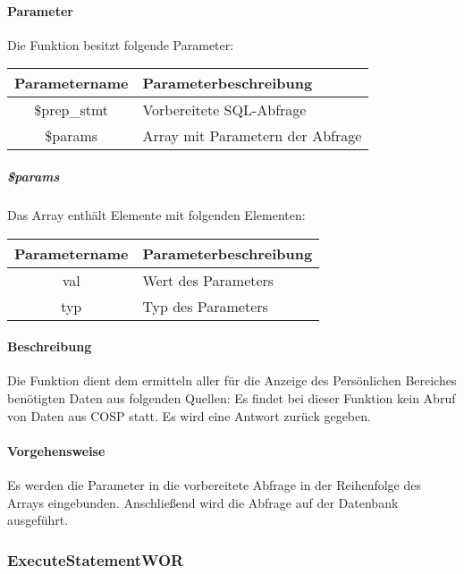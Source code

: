 \paragraph{Parameter} Die Funktion besitzt folgende Parameter:
\begin{table}[H]
	\begin{tabular}{|c|p{11cm}|}
		\hline
		\textbf{Parametername} & \textbf{Parameterbeschreibung} \\ \hline
		\$prep\_stmt & Vorbereitete SQL-Abfrage \\ \hline
		\$params     & Array mit Parametern der Abfrage \\ \hline
	\end{tabular}
\end{table}
\subparagraph{\$params}Das Array enthält Elemente mit folgenden Elementen:
\begin{table}[H]
	\begin{tabular}{|c|p{11cm}|}
		\hline
		\textbf{Parametername} & \textbf{Parameterbeschreibung} \\ \hline
		val & Wert des Parameters \\ \hline
		typ & Typ des Parameters \\ \hline
	\end{tabular}
\end{table}
\paragraph{Beschreibung} Die Funktion dient dem ermitteln aller für die Anzeige des Persönlichen Bereiches benötigten Daten aus folgenden Quellen:
Es findet bei dieser Funktion kein Abruf von Daten aus {\glqq COSP\grqq} statt. Es wird eine Antwort zurück gegeben.
\paragraph{Vorgehensweise} Es werden die Parameter in die vorbereitete Abfrage in der Reihenfolge des Arrays eingebunden. Anschließend wird die Abfrage auf der Datenbank ausgeführt.
\subsubsection{ExecuteStatementWOR}
